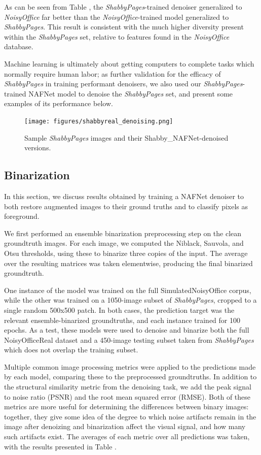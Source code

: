 \documentclass[runningheads]{llncs}
\begin{document}
As can be seen from Table \cite{tab:denoising_results}, the \emph{ShabbyPages}-trained denoiser generalized to \emph{NoisyOffice} far better than the \emph{NoisyOffice}-trained model generalized to \emph{ShabbyPages}. This result is consistent with the much higher diversity present within the \emph{ShabbyPages} set, relative to features found in the \emph{NoisyOffice} database.

Machine learning is ultimately about getting computers to complete tasks which normally require human labor; as further validation for the efficacy of \emph{ShabbyPages} in training performant denoisers, we also used our \emph{ShabbyPages}-trained NAFNet model to denoise the \emph{ShabbyPages} set, and present some examples of its performance below.

\begin{figure}
\centering
\texttt{[image: figures/shabbyreal\_denoising.png]}
\caption{Sample \emph{ShabbyPages} images and their Shabby\_NAFNet-denoised versions.}
\label{fig:shabbyreal_denoising}
\end{figure}

\subsection{Binarization}
In this section, we discuss results obtained by training a NAFNet denoiser to both restore augmented images to their ground truths and to classify pixels as foreground.

We first performed an ensemble binarization preprocessing step on the clean groundtruth images.
For each image, we computed the Niblack, Sauvola, and Otsu thresholds, using these to binarize three copies of the input. The average over the resulting matrices was taken elementwise, producing the final binarized groundtruth.

One instance of the model was trained on the full SimulatedNoisyOffice corpus, while the other was trained on a 1050-image subset of \emph{ShabbyPages}, cropped to a single random 500x500 patch. In both cases, the prediction target was the relevant ensemble-binarized groundtruths, and each instance trained for 100 epochs.
As a test, these models were used to denoise and binarize both the full NoisyOfficeReal dataset and a 450-image testing subset taken from \emph{ShabbyPages} which does not overlap the training subset.

Multiple common image processing metrics were applied to the predictions made by each model, comparing these to the preprocessed groundtruths.
In addition to the structural similarity metric from the denoising task, we add the peak signal to noise ratio (PSNR) and the root mean squared error (RMSE). Both of these metrics are more useful for determining the differences between binary images: together, they give some idea of the degree to which noise artifacts remain in the image after denoizing and binarization affect the visual signal, and how many such artifacts exist.
The averages of each metric over all predictions was taken, with the results presented in Table \cite{tab:binarization_results}.
\end{document}

